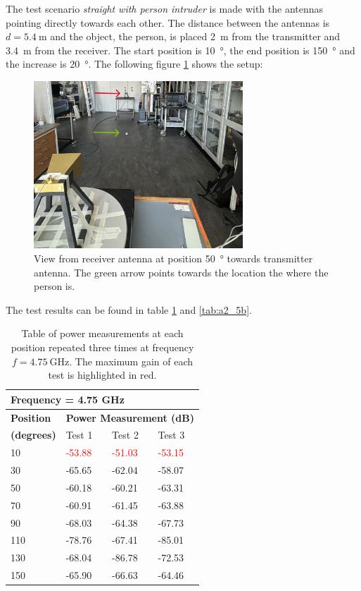 The test scenario \textit{straight with person intruder} is made with the antennas pointing directly towards each other. The distance between the antennas is $d=\SI{5.4}{\meter}$ and the object, the person, is placed \SI{2}{\meter} from the transmitter and \SI{3.4}{\meter} from the receiver. The start position is \SI{10}{\degree}, the end position is \SI{150}{\degree} and the increase is \SI{20}{\degree}. The following figure \ref{fig:a2_5} shows the setup:
\begin{figure}[H]
    \centering
    \includegraphics[width=0.7\textwidth]{figures/test_intruder_person.JPG}
    \caption{View from receiver antenna at position \SI{50}{\degree} towards transmitter antenna. The green arrow points towards the location the where the person is.} \label{fig:a2_5}
\end{figure}

The test results can be found in table \ref{tab:a2_5a} and \ref{tab:a2_5b}.
\begin{table}[H]
    \centering
    \begin{tabular}{l|l|l|l}
        \multicolumn{4}{l}{\textbf{Frequency = 4.75 GHz}}         \\
        \hline
        \textbf{Position} & \multicolumn{3}{l}{\textbf{Power Measurement (dB)}} \\
        \textbf{(degrees)}  & Test 1    & Test 2  & Test 3  \\
        \hline
        \hline
        10      & \textcolor{red}{-53.88}    & \textcolor{red}{-51.03}    & \textcolor{red}{-53.15} \\
        30      & -65.65    & -62.04    & -58.07 \\
        50      & -60.18    & -60.21    & -63.31 \\
        70      & -60.91    & -61.45    & -63.88 \\
        90      & -68.03    & -64.38    & -67.73 \\
        110     & -78.76    & -67.41    & -85.01 \\
        130     & -68.04    & -86.78    & -72.53 \\
        150     & -65.90    & -66.63    & -64.46
        \end{tabular}
    \caption{Table of power measurements at each position repeated three times at frequency $f=\SI{4.75}{\giga\hertz}$. The maximum gain of each test is highlighted in red.}
    \label{tab:a2_5a}
\end{table}

